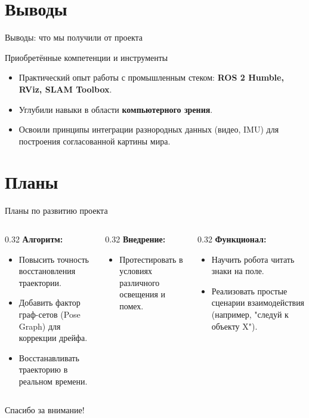 \documentclass{beamer}
\begin{document}
\section{Выводы}
\begin{frame}{Выводы: что мы получили от проекта}
    \begin{block}{Приобретённые компетенции и инструменты}
        \begin{itemize}
            \item Практический опыт работы с промышленным стеком: \textbf{ROS 2 Humble, RViz, SLAM Toolbox}.
            \item Углубили навыки в области \textbf{компьютерного зрения}.
            \item Освоили принципы интеграции разнородных данных (видео, IMU) для построения согласованной картины мира.
        \end{itemize}
    \end{block}
\end{frame}

\section{Планы}
\begin{frame}{Планы по развитию проекта}
    \centering
    \begin{columns}[T, onlytextwidth]
        \begin{column}{0.32\textwidth}
            \textbf{Алгоритм:}
            \begin{itemize}\footnotesize
                \item Повысить точность восстановления траектории.
                \item Добавить фактор граф-сетов (Pose Graph) для коррекции дрейфа.
                \item Восстанавливать траекторию в реальном времени.
            \end{itemize}
        \end{column}
        \begin{column}{0.32\textwidth}
            \textbf{Внедрение:}
            \begin{itemize}\footnotesize
                \item Протестировать в условиях различного освещения и помех.
            \end{itemize}
        \end{column}
        \begin{column}{0.32\textwidth}
            \textbf{Функционал:}
            \begin{itemize}\footnotesize
                \item Научить робота читать знаки на поле.
                \item Реализовать простые сценарии взаимодействия (например, "следуй к объекту X").
            \end{itemize}
        \end{column}
    \end{columns}
\end{frame}

\begin{frame}
    \centering
    \Huge Спасибо за внимание!
\end{frame}
\end{document}
